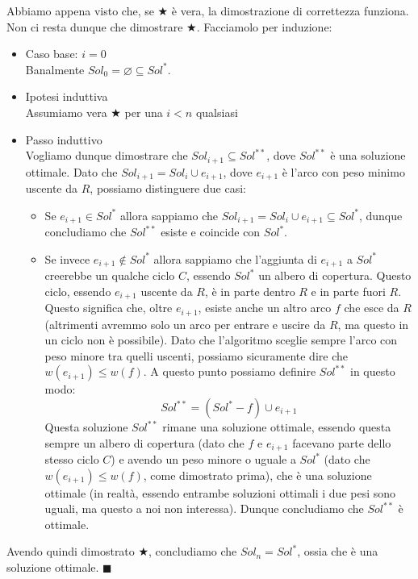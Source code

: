\documentclass[11pt, a4paper, titlepage, oneside]{scrbook}
\begin{document}
Abbiamo appena visto che, se $\bigstar$ è vera, la dimostrazione di correttezza funziona. Non ci resta dunque che dimostrare $\bigstar$. Facciamolo per induzione:
\begin{itemize}
    \item Caso base: $i = 0$ \\
    Banalmente $Sol_0 = \varnothing \subseteq Sol^*$. 
    \item Ipotesi induttiva \\
    Assumiamo vera $\bigstar$ per una $i < n$ qualsiasi
    \item Passo induttivo \\
    Vogliamo dunque dimostrare che $Sol_{i+1} \subseteq Sol^{**}$, dove $Sol^{**}$ è una soluzione ottimale. Dato che $Sol_{i+1} = Sol_i \cup e_{i+1}$, dove $e_{i+1}$ è l'arco con peso minimo uscente da $R$, possiamo distinguere due casi:
    \begin{itemize}
        \item Se $e_{i+1} \in Sol^*$ allora sappiamo che $Sol_{i+1} = Sol_i \cup e_{i+1} \subseteq Sol^*$, dunque concludiamo che $Sol^{**}$ esiste e coincide con $Sol^*$.
        \item Se invece $e_{i+1} \notin Sol^*$ allora sappiamo che l'aggiunta di $e_{i+1}$ a $Sol^*$ creerebbe un qualche ciclo $C$, essendo $Sol^*$ un albero di copertura. Questo ciclo, essendo $e_{i+1}$ uscente da $R$, è in parte dentro $R$ e in parte fuori $R$. Questo significa che, oltre $e_{i+1}$, esiste anche un altro arco $f$ che esce da $R$ (altrimenti avremmo solo un arco per entrare e uscire da $R$, ma questo in un ciclo non è possibile). Dato che l'algoritmo sceglie sempre l'arco con peso minore tra quelli uscenti, possiamo sicuramente dire che $w(e_{i+1}) \leq w(f)$. A questo punto possiamo definire $Sol^{**}$ in questo modo:
        \[Sol^{**} = (Sol^* - f) \cup e_{i+1}\]
        Questa soluzione $Sol^{**}$ rimane una soluzione ottimale, essendo questa sempre un albero di copertura (dato che $f$ e $e_{i+1}$ facevano parte dello stesso ciclo $C$) e avendo un peso minore o uguale a $Sol^*$ (dato che $w(e_{i+1}) \leq w(f)$, come dimostrato prima), che è una soluzione ottimale (in realtà, essendo entrambe soluzioni ottimali i due pesi sono uguali, ma questo a noi non interessa). Dunque concludiamo che $Sol^{**}$ è ottimale.
    \end{itemize}
\end{itemize}

Avendo quindi dimostrato $\bigstar$, concludiamo che $Sol_n = Sol^*$, ossia che  è una soluzione ottimale. $\blacksquare$
\end{document}
